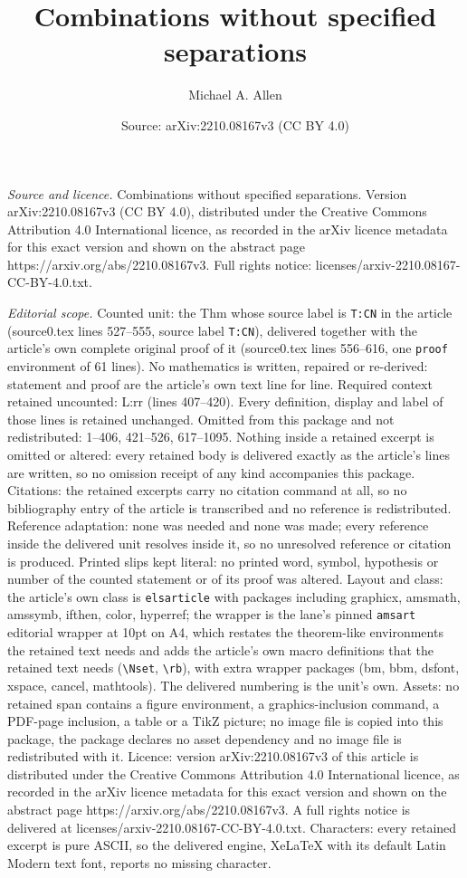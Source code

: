 \documentclass[10pt,a4paper]{amsart}
\title[Combinations without specified separations]{Combinations without specified separations}
\author{Michael A. Allen}
\date{Source: arXiv:2210.08167v3 (CC BY 4.0)}
\begin{document}
\maketitle

\noindent\emph{Source and licence.} Combinations without specified separations. Version arXiv:2210.08167v3 (CC BY 4.0), distributed under the Creative Commons Attribution 4.0 International licence, as recorded in the arXiv licence metadata for this exact version and shown on the abstract page https://arxiv.org/abs/2210.08167v3. Full rights notice: licenses/arxiv-2210.08167-CC-BY-4.0.txt.\par\smallskip

\noindent\textit{Editorial scope.} Counted unit: the Thm whose source label is \texttt{T:CN} in the article (source0.tex lines 527--555, source label \texttt{T:CN}), delivered together with the article's own complete original proof of it (source0.tex lines 556--616, one \texttt{proof} environment of 61 lines). No mathematics is written, repaired or re-derived: statement and proof are the article's own text line for line. Required context retained uncounted: L:rr (lines 407--420). Every definition, display and label of those lines is retained unchanged. Omitted from this package and not redistributed: 1--406, 421--526, 617--1095. Nothing inside a retained excerpt is omitted or altered: every retained body is delivered exactly as the article's lines are written, so no omission receipt of any kind accompanies this package. Citations: the retained excerpts carry no citation command at all, so no bibliography entry of the article is transcribed and no reference is redistributed. Reference adaptation: none was needed and none was made; every reference inside the delivered unit resolves inside it, so no unresolved reference or citation is produced. Printed slips kept literal: no printed word, symbol, hypothesis or number of the counted statement or of its proof was altered. Layout and class: the article's own class is \texttt{elsarticle} with packages including graphicx, amsmath, amssymb, ifthen, color, hyperref; the wrapper is the lane's pinned \texttt{amsart} editorial wrapper at 10pt on A4, which restates the theorem-like environments the retained text needs and adds the article's own macro definitions that the retained text needs (\texttt{\textbackslash Nset}, \texttt{\textbackslash rb}), with extra wrapper packages (bm, bbm, dsfont, xspace, cancel, mathtools). The delivered numbering is the unit's own. Assets: no retained span contains a figure environment, a graphics-inclusion command, a PDF-page inclusion, a table or a TikZ picture; no image file is copied into this package, the package declares no asset dependency and no image file is redistributed with it. Licence: version arXiv:2210.08167v3 of this article is distributed under the Creative Commons Attribution 4.0 International licence, as recorded in the arXiv licence metadata for this exact version and shown on the abstract page https://arxiv.org/abs/2210.08167v3. A full rights notice is delivered at licenses/arxiv-2210.08167-CC-BY-4.0.txt. Characters: every retained excerpt is pure ASCII, so the delivered engine, XeLaTeX with its default Latin Modern text font, reports no missing character.
\end{document}
